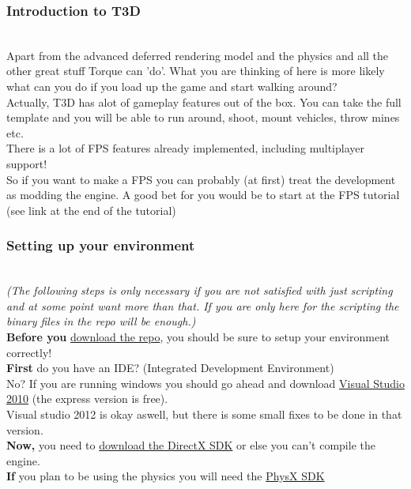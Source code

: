 \begin{frame}
\frametitle{Introduction to T3D}
\\
	Apart from the advanced deferred rendering model and the physics and all the other great stuff Torque can 'do'. What you are thinking of here is more likely
	what can you do if you load up the game and start walking around?\\
	Actually, T3D has alot of gameplay features out of the box. You can take the full template and you will be able to run around, shoot, mount vehicles, throw mines etc.\\
	There is a lot of FPS features already implemented, including multiplayer support!\\
	So if you want to make a FPS you can probably (at first) treat the development as modding the engine. A good bet for you would be to start at the FPS tutorial (see link at the end of the tutorial)\\
\end{frame}

\begin{frame}
\frametitle{Setting up your environment}
\\
	{\it(The following steps is only necessary if you are not satisfied with just scripting and at some point want more than that. If you are only here for the scripting the binary files in the repo will be enough.)}\\
	{\bf Before you} {\color{blue} \href{http://github.com/GarageGames/Torque3D}{download the repo}}, you should be sure to setup your environment correctly!\\
	{\bf First} do you have an IDE? (Integrated Development Environment)\\
	No? If you are running windows you should go ahead and download {\color{blue} \href{http://microsoft.com/visualstudio/eng/downloads\#d-2010-express}{Visual Studio 2010}} (the express version is free).\\
	Visual studio 2012 is okay aswell, but there is some small fixes to be done in that version.\\
	{\bf Now,} you need to {\color{blue} \href{microsoft.com/en-us/download/details.aspx?id=6812}{download the DirectX SDK}} or else you can't compile the engine.\\
	{\bf If} you plan to be using the physics you will need the {\color{blue} \href{nvidia.com/object/physx_downloads.html}{PhysX SDK}}\\
\end{frame}

